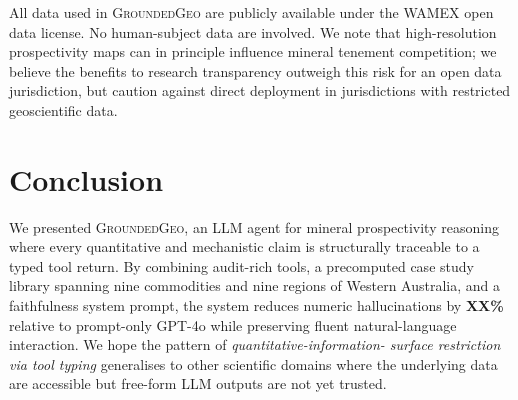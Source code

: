 \documentclass[11pt]{article}
\begin{document}
All data used in \textsc{GroundedGeo} are publicly available under
the WAMEX open data license. No human-subject data are involved.
We note that high-resolution prospectivity maps can in principle
influence mineral tenement competition; we believe the benefits to
research transparency outweigh this risk for an open data
jurisdiction, but caution against direct deployment in jurisdictions
with restricted geoscientific data.

\section{Conclusion}

We presented \textsc{GroundedGeo}, an LLM agent for mineral
prospectivity reasoning where every quantitative and mechanistic
claim is structurally traceable to a typed tool return. By combining
audit-rich tools, a precomputed case study library spanning nine
commodities and nine regions of Western Australia, and a faithfulness
system prompt, the system reduces numeric hallucinations by \textbf{XX\%}
relative to prompt-only GPT-4o while preserving fluent natural-language
interaction. We hope the pattern of \emph{quantitative-information-
surface restriction via tool typing} generalises to other scientific
domains where the underlying data are accessible but free-form LLM
outputs are not yet trusted.

\end{document}
